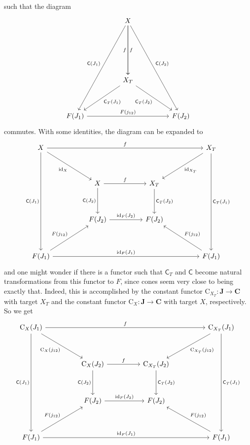 such that the diagram
\[
\begin{tikzcd}[sep=huge]
  &
  X
  \arrow{dddr}{\mathsf{C}(J_{2})}
  \arrow{dd}{f}
  \arrow[swap]{dd}{f}
  \arrow[swap]{dddl}{\mathsf{C}(J_{1})}
  &
  \\
  &
  &
  \\
  &
  X_{T}
  \arrow[swap]{dr}{\mathsf{C}_{T}(J_{2})}
  \arrow{dl}{\mathsf{C}_{T}(J_{1})}
  &
  \\
  F(J_{1})
  \arrow{rr}{F(j_{12})}
  &
  &
  F(J_{2})
\end{tikzcd}
\]
commutes.
With some identities, the diagram can be expanded to
\[
\begin{tikzcd}[sep=huge]
  X
  \arrow{rrr}{f}
  \arrow[swap]{dr}{\mathrm{id}_{X}}
  \arrow[swap]{ddd}{\mathsf{C}(J_{1})}
  &
  &
  &
  X_{T}
  \arrow{ddd}{\mathsf{C}_{T}(J_{1})}
  \arrow{dl}{\mathrm{id}_{X_{T}}}
  \\
  &
  X
  \arrow{r}{f}
  \arrow[swap]{d}{\mathsf{C}(J_{2})}
  &
  X_{T}
  \arrow{d}{\mathsf{C}_{T}(J_{2})}
  &
  \\
  &
  F(J_{2})
  \arrow{r}{\mathrm{id}_{F}(J_{2})}
  &
  F(J_{2})
  &
  \\
  F(J_{1})
  \arrow{rrr}{\mathrm{id}_{F}(J_{1})}
  \arrow{ur}{F(j_{12})}
  &
  &
  &
  F(J_{1})
  \arrow[swap]{ul}{F(j_{12})}
\end{tikzcd}
\]
and one might wonder if there is a functor such that $\mathsf{C}_{T}$ and $\mathsf{C}$ become natural transformations from this functor to $F$, since cones seem very close to being exactly that.
Indeed, this is accomplished by the constant functor $\mathrm{C}_{X_{T}} \colon \mathbf{J} \rightarrow \mathbf{C}$ with target $X_{T}$ and the constant functor $\mathrm{C}_{X} \colon \mathbf{J} \rightarrow \mathbf{C}$ with target $X$, respectively.
So we get
\[
\begin{tikzcd}[sep=huge]
  \mathrm{C}_{X}(J_{1})
  \arrow{rrr}{f}
  \arrow[swap]{dr}{\mathrm{C}_{X}(j_{12})}
  \arrow[swap]{ddd}{\mathsf{C}(J_{1})}
  &
  &
  &
  \mathrm{C}_{X_{T}}(J_{1})
  \arrow{ddd}{\mathsf{C}_{T}(J_{1})}
  \arrow{dl}{\mathrm{C}_{X_{T}}(j_{12})}
  \\
  &
  \mathrm{C}_{X}(J_{2})
  \arrow{r}{f}
  \arrow[swap]{d}{\mathsf{C}(J_{2})}
  &
  \mathrm{C}_{X_{T}}(J_{2})
  \arrow{d}{\mathsf{C}_{T}(J_{2})}
  &
  \\
  &
  F(J_{2})
  \arrow{r}{\mathrm{id}_{F}(J_{2})}
  &
  F(J_{2})
  &
  \\
  F(J_{1})
  \arrow{rrr}{\mathrm{id}_{F}(J_{1})}
  \arrow{ur}{F(j_{12})}
  &
  &
  &
  F(J_{1})
  \arrow[swap]{ul}{F(j_{12})}
\end{tikzcd}
\]
